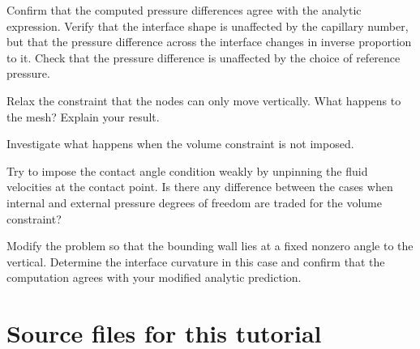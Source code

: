 \begin{DoxyEnumerate}
\item Confirm that the computed pressure differences agree with the analytic expression. Verify that the interface shape is unaffected by the capillary number, but that the pressure difference across the interface changes in inverse proportion to it. Check that the pressure difference is unaffected by the choice of reference pressure.~\newline
~\newline

\item Relax the constraint that the nodes can only move vertically. What happens to the mesh? Explain your result.~\newline
~\newline

\item Investigate what happens when the volume constraint is not imposed.~\newline
~\newline

\item Try to impose the contact angle condition weakly by unpinning the fluid velocities at the contact point. Is there any difference between the cases when internal and external pressure degrees of freedom are traded for the volume constraint? ~\newline
~\newline

\item Modify the problem so that the bounding wall lies at a fixed nonzero angle to the vertical. Determine the interface curvature in this case and confirm that the computation agrees with your modified analytic prediction.~\newline
~\newline

\end{DoxyEnumerate}

 

\hypertarget{index_sources}{}\section{Source files for this tutorial}\label{index_sources}

